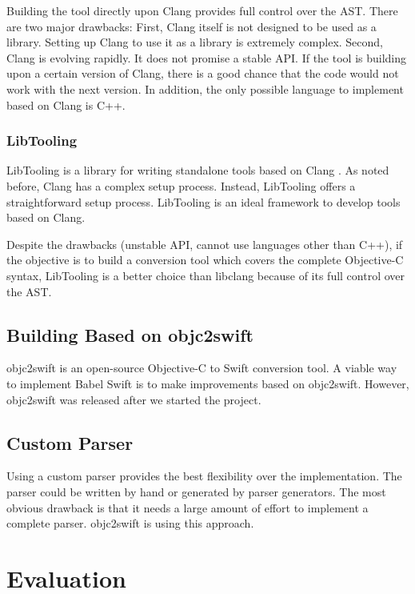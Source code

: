 \documentclass{sfuthesis}
\begin{document}
Building the tool directly upon Clang provides full control over the AST. There are two major drawbacks: First, Clang itself is not designed to be used as a library. Setting up Clang to use it as a library is extremely complex. Second, Clang is evolving rapidly. It does not promise a stable API. If the tool is building upon a certain version of Clang, there is a good chance that the code would not work with the next version. In addition, the only possible language to implement based on Clang is C++.

\subsection{LibTooling}

LibTooling is a library for writing standalone tools based on Clang \cite{libtooling}. As noted before, Clang has a complex setup process. Instead, LibTooling offers a straightforward setup process. LibTooling is an ideal framework to develop tools based on Clang.

Despite the drawbacks (unstable API, cannot use languages other than C++), if the objective is to build a conversion tool which covers the complete Objective-C syntax, LibTooling is a better choice than libclang because of its full control over the AST.

\section{Building Based on objc2swift}

objc2swift \cite{objc2swift} is an open-source Objective-C to Swift conversion tool. A viable way to implement Babel Swift is to make improvements based on objc2swift. However, objc2swift was released after we started the project.

\section{Custom Parser}

Using a custom parser provides the best flexibility over the implementation. The parser could be written by hand or generated by parser generators. The most obvious drawback is that it needs a large amount of effort to implement a complete parser. objc2swift \cite{objc2swift} is using this approach.

\chapter{Evaluation}
\end{document}
